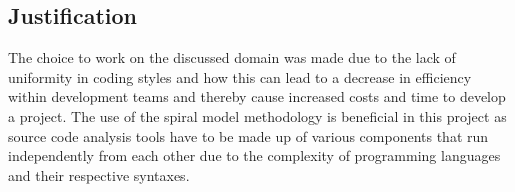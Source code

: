 \subsection{Justification}
The choice to work on the discussed domain was made due to the lack of uniformity in coding styles and how this can lead to a decrease in efficiency within development teams and thereby cause increased costs and time to develop a project. The use of the spiral model methodology is beneficial in this project as source code analysis tools have to be made up of various components that run independently from each other due to the complexity of programming languages and their respective syntaxes. 
